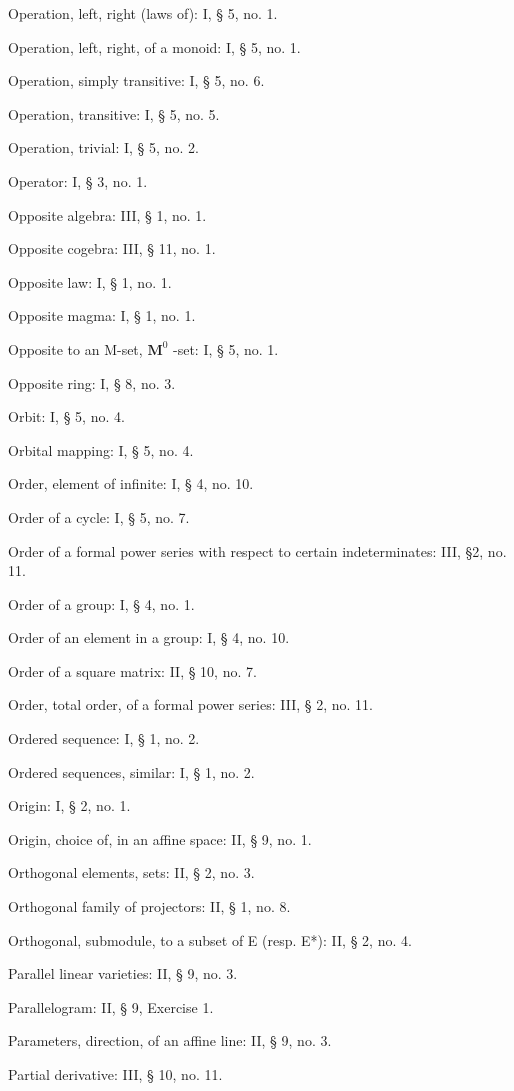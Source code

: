 Operation, left, right (laws of): I, § 5, no. 1.

Operation, left, right, of a monoid: I, § 5, no. 1.

Operation, simply transitive: I, § 5, no. 6.

Operation, transitive: I, § 5, no. 5.

Operation, trivial: I, § 5, no. 2.

Operator: I, § 3, no. 1.

Opposite algebra: III, § 1, no. 1.

Opposite cogebra: III, § 11, no. 1.

Opposite law: I, § 1, no. 1.

Opposite magma: I, § 1, no. 1.

Opposite to an M-set, \(\mathbf{M}^0\) -set: I, § 5, no. 1.

Opposite ring: I, § 8, no. 3.

Orbit: I, § 5, no. 4.

Orbital mapping: I, § 5, no. 4.

Order, element of infinite: I, § 4, no. 10.

Order of a cycle: I, § 5, no. 7.

Order of a formal power series with respect to certain indeterminates: III, §2, no. 11.

Order of a group: I, § 4, no. 1.

Order of an element in a group: I, § 4, no. 10.

Order of a square matrix: II, § 10, no. 7.

Order, total order, of a formal power series: III, § 2, no. 11.

Ordered sequence: I, § 1, no. 2.

Ordered sequences, similar: I, § 1, no. 2.

Origin: I, § 2, no. 1.

Origin, choice of, in an affine space: II, § 9, no. 1.

Orthogonal elements, sets: II, § 2, no. 3.

Orthogonal family of projectors: II, § 1, no. 8.

Orthogonal, submodule, to a subset of E (resp. E*): II, § 2, no. 4.

Parallel linear varieties: II, § 9, no. 3.

Parallelogram: II, § 9, Exercise 1.

Parameters, direction, of an affine line: II, § 9, no. 3.

Partial derivative: III, § 10, no. 11.

